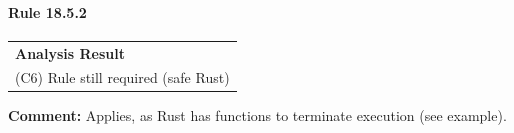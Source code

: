 \paragraph{Rule 18.5.2}
\begin{longtable}{p{13cm}}
\textbf{Analysis Result} \\
(C6) Rule still required (safe Rust) \\
\end{longtable}
\textbf{Comment:} Applies, as Rust has functions to terminate execution (see example). \\


